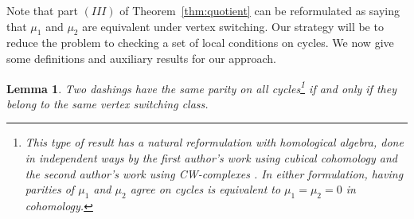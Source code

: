 \documentclass[12pt,twoside,singlespace]{article}
\numberwithin{equation}{section}
\newtheorem{lem}[equation]{Lemma}
\theoremstyle{definition}
\begin{document}
Note that part $(III)$ of Theorem~\ref{thm:quotient} can be reformulated as saying that $\mu_1$ and $\mu_2$ are equivalent under vertex switching. Our strategy will be to reduce the problem to checking a set of local conditions on cycles. We now give some definitions and auxiliary results for our approach.


\begin{lem}
\label{lem:cycles-switching-class}
Two dashings have the same parity on all cycles\footnote{This type of result has a natural reformulation with homological algebra, done in independent ways by the first author's work using cubical cohomology \cite{dil:cohomology} and the second author's work using CW-complexes \cite{zhang:adinkras}. In either formulation, having parities of $\mu_1$ and $\mu_2$ agree on cycles is equivalent to $\mu_1 = \mu_2 = 0$ in cohomology.} if and only if they belong to the same vertex switching class.
\end{lem}
\end{document}
